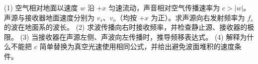 (1) 空气相对地面以速度 \(w\) 沿 \(+x\) 匀速流动，声音相对空气传播速率为 \(c>|w|\)。声源与接收器地面速度分别为 \(v_s\)、\(v_o\)（均按 \(+x\) 为正）。求声源向右发射频率为 \(f_s\) 的波在地面系的波长。
(2) 求波传播向右时接收频率，并检查静止源、接收器的极限。
(3) 当接收器在声源左侧、声波向左传播时，推导频移表达式。
(4) 解释为什么不能把 \(c\) 简单替换为真空光速使用相同公式，并给出避免波面堆积的速度条件。

